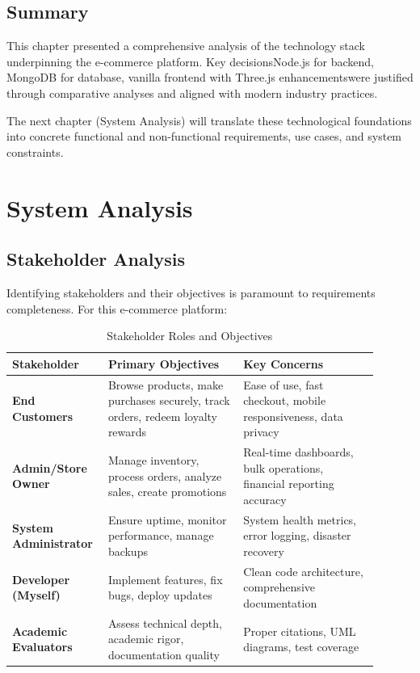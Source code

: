 \documentclass[12pt, a4paper]{report}
\begin{document}
\section{Summary}

This chapter presented a comprehensive analysis of the technology stack underpinning the e-commerce platform. Key decisionsNode.js for backend, MongoDB for database, vanilla frontend with Three.js enhancementswere justified through comparative analyses and aligned with modern industry practices.

The next chapter (System Analysis) will translate these technological foundations into concrete functional and non-functional requirements, use cases, and system constraints.


\chapter{System Analysis}



\section{Stakeholder Analysis}

Identifying stakeholders and their objectives is paramount to requirements completeness. For this e-commerce platform:

\begin{table}[H]
\centering
\caption{Stakeholder Roles and Objectives}
\label{tab:stakeholders}
\begin{tabular}{@{}p{0.20\linewidth}p{0.35\linewidth}p{0.35\linewidth}@{}}
\toprule
\textbf{Stakeholder} & \textbf{Primary Objectives} & \textbf{Key Concerns} \\
\midrule
\textbf{End Customers} & Browse products, make purchases securely, track orders, redeem loyalty rewards & Ease of use, fast checkout, mobile responsiveness, data privacy \\
\textbf{Admin/Store Owner} & Manage inventory, process orders, analyze sales, create promotions & Real-time dashboards, bulk operations, financial reporting accuracy \\
\textbf{System Administrator} & Ensure uptime, monitor performance, manage backups & System health metrics, error logging, disaster recovery \\
\textbf{Developer (Myself)} & Implement features, fix bugs, deploy updates & Clean code architecture, comprehensive documentation \\
\textbf{Academic Evaluators} & Assess technical depth, academic rigor, documentation quality & Proper citations, UML diagrams, test coverage \\
\bottomrule
\end{tabular}
\end{table}
\end{document}
